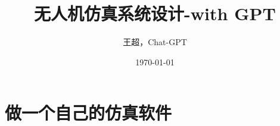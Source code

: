 \documentclass{article}
\title{无人机仿真系统设计-with GPT}
\author{王超，Chat-GPT}
\date{\today}
\begin{document}
	\maketitle
	\tableofcontents

	\newpage
	\section{做一个自己的仿真软件}

\end{document}

